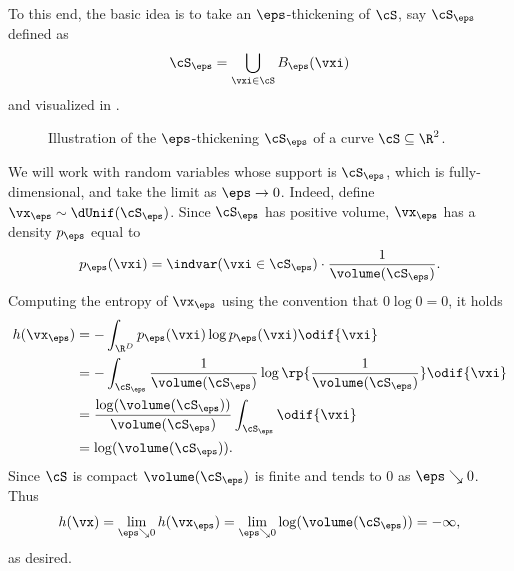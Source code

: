 \documentclass[../../book-main.tex]{subfiles}
\begin{document}
To this end, the basic idea is to take an \(\eps\)-thickening of
\(\cS\), say \(\cS_{\eps}\) defined as
\begin{equation}
    \cS_{\eps} = \bigcup_{\vxi \in \cS}B_{\eps}(\vxi)
\end{equation}
and visualized in .
\begin{figure}[th]
    \centering
    \caption{Illustration of the \(\eps\)-thickening \(\cS_\eps\) of
    a curve \(\cS \subseteq \R^{2}\).}
    \label{fig:entropy_eps_thickening}
\end{figure}
We will work with random variables whose support is \(\cS_{\eps}\),
which is fully-dimensional, and take the limit as \(\eps \to 0\).
Indeed, define \(\vx_{\eps} \sim \dUnif(\cS_{\eps})\). Since
\(\cS_{\eps}\) has positive volume, \(\vx_{\eps}\) has a density
\(p_{\eps}\) equal to
\begin{equation}
    p_{\eps}(\vxi) = \indvar(\vxi \in \cS_{\eps}) \cdot
    \frac{1}{\volume(\cS_{\eps})}.
\end{equation}
Computing the entropy of \(\vx_{\eps}\) using the convention that \(0
\log 0 = 0\), it holds
\begin{align}
    h(\vx_{\eps})
    &= -\int_{\R^{D}}p_{\eps}(\vxi)\log p_{\eps}(\vxi)\odif{\vxi} \\
    &= -\int_{\cS_{\eps}}\frac{1}{\volume(\cS_{\eps})}
    \log\rp{\frac{1}{\volume(\cS_{\eps})}}\odif{\vxi} \\
    &=
    \frac{\log(\volume(\cS_{\eps}))}{\volume(\cS_{\eps})}\int_{\cS_{\eps}}\odif{\vxi}
    \\
    &= \log(\volume(\cS_{\eps})).
\end{align}
Since \(\cS\) is compact \(\volume(\cS_{\eps})\) is finite and tends
to \(0\) as \(\eps \searrow 0\). Thus
\begin{equation}
    h(\vx) = \lim_{\eps \searrow 0}h(\vx_{\eps}) = \lim_{\eps
    \searrow 0}\log(\volume(\cS_{\eps})) = -\infty,
\end{equation}
as desired.
\end{document}
